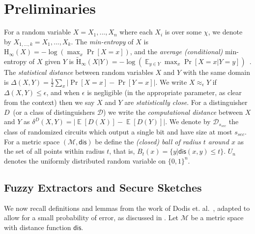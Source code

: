 \documentclass[11pt]{article}
\DeclareMathOperator*{\expe}{\mathbb{E}}
\newcommand{\dis}{\ensuremath{\mathsf{dis}}}
\newcommand{\Hoo}{\mathrm{H}_\infty}
\newcommand{\Hav}{\tilde{\mathrm{H}}_\infty}
\def\col{\mathrm{Col}}
\newcommand{\authnote}[2]{{\textcolor{red}{\textsf{#1 notes: }\textcolor{blue}{ #2}}\marginpar{\textcolor{red}{\textbf{!!!!!}}}}}
\newcommand{\authnote}[2]{}
\newcommand{\lnote}[1]{{\authnote{Leo}{#1}}}
\begin{document}
\section{Preliminaries}
\label{sec:preliminaries}
For a random variable $X = X_1,..., X_n$ where each $X_i$ is over some $\chi$, we denote by $X_{1,..., k} = X_1,..., X_k$.  The {\em min-entropy} of $X$ is $\Hoo(X) = -\log(\max_x \Pr[X=x])$, 
and the {\em average (conditional)} min-entropy of $X$ given $Y$ is  $\Hav(X|Y) = -\log(\expe_{y\in Y} \max_{x} \Pr[X=x|Y=y])$~\cite[Section 2.4]{DBLP:journals/siamcomp/DodisORS08}.  
The {\em statistical distance} between random variables $X$ and $Y$ with the same domain is $\Delta(X,Y) = \frac12 \sum_x |\Pr[X=x] - \Pr[Y=x]|$. We write $X \approx_{\epsilon} Y$ if $\Delta(X,Y) \leq \epsilon$, and when $\epsilon$ is negligible (in the appropriate parameter, as clear from the context) then we say $X$ and $Y$ are \emph{statistically close}.  For a distinguisher $D$~(or a class of distinguishers $\mathcal{D}$) we write the \emph{computational distance} between $X$ and $Y$ as $\delta^D(X,Y) = \left| \expe[D(X)]-\expe[D(Y)]\right |$.  We denote by $\mathcal{D}_{s_{sec}}$ the class of randomized circuits which output a single bit and have size at most $s_{sec}$.
For a metric space $(\mathcal{M}, \dis)$ be define the \emph{(closed) ball of radius $t$ around $x$} as the  set of all points within radius $t$, that is, $B_t(x) = \{y| \dis(x, y)\leq t\}$. $U_n$ denotes the uniformly  distributed random variable on $\{0,1\}^n$.

\subsection{Fuzzy Extractors and Secure Sketches}
\label{sec:fuzzy extractors}

We now recall definitions and lemmas from the work of Dodis et. al.~\cite[Sections 2.5--4.1]{DBLP:journals/siamcomp/DodisORS08}, adapted to allow for a small probability of error, as discussed in \cite[Sections 8]{DBLP:journals/siamcomp/DodisORS08}.  Let $\mathcal{M}$ be a metric space with distance function $\dis$.%
\end{document}
